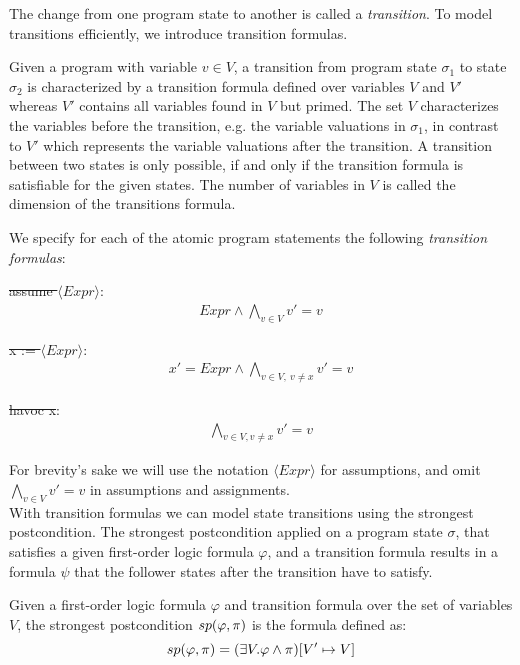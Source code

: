 The change from one program state to another is called a \textsl{transition}. To model transitions efficiently, we introduce transition formulas.
\begin{mydef}
		Given a program \prg with variable $v \in V$, a transition from program state $\sigma_1$ to state $\sigma_2$ is characterized by a transition formula defined over variables $V$ and $V'$ whereas $V'$ contains all variables found in $V$ but primed. The set $V$ characterizes the variables before the transition, e.g. the variable valuations in $\sigma_1$, in contrast to $V'$ which represents the variable valuations after the transition. A transition between two states is only possible, if and only if the transition formula is satisfiable for the given states. The number of variables in $V$ is called the dimension of the transitions formula.
\end{mydef}
 We specify for each of the atomic program statements the following \textsl{transition formulas}: 
 \begin{center}
	\st{assume $\langle Expr \rangle$}:
	\begin{align*}
		Expr \land \bigwedge\limits_{v \in V} v' = v
	\end{align*}
	\vspace*{0.5cm}

	\st{x := $\langle Expr \rangle$}:
	\begin{align*}
		x' = Expr \land \bigwedge\limits_{v \in V,\ v \not= x} v' = v 
	\end{align*}
	\vspace*{0.5cm}
	
	\st{havoc x}: 
	\begin{align*}
			\bigwedge\limits_{v \in V, v \not= x} v' = v 
	\end{align*}
 \end{center}
For brevity's sake we will use the notation \st{$\langle Expr \rangle$} for assumptions, and omit $\bigwedge\limits_{v \in V} v' = v$ in assumptions and assignments. \\
With transition formulas we can model state transitions using the strongest postcondition. The strongest postcondition applied on a program state $\sigma$, that satisfies a given first-order logic formula $\varphi$, and a transition formula \trf results in a formula $\psi$ that the follower states after the transition have to satisfy.
\begin{mydef}
	Given a first-order logic formula $\varphi$ and transition formula \trf over the set of variables $V$, the strongest postcondition $	sp(\varphi, \pi)$ is the formula defined as:
	\begin{equation*}
		sp(\varphi, \pi) = (\exists V. \varphi \land \pi)[V' \mapsto V]
	\end{equation*}
\end{mydef}
